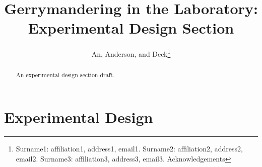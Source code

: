 \documentclass[AER]{AEA}
\begin{document}
\title{Gerrymandering in the Laboratory: Experimental Design Section}
\author{An,  Anderson, and Deck\thanks{Surname1: affiliation1, address1, email1. 
Surname2: affiliation2, address2, email2. Surname3: affiliation3, address3, email3. Acknowledgements}}

\begin{abstract}
An experimental design section draft.
\end{abstract}


\maketitle


\section{Experimental Design}
\end{document}

